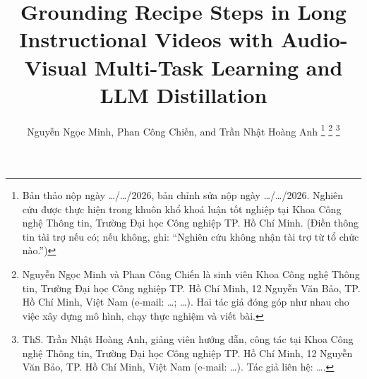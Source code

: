 \documentclass{IEEEtran}
\begin{document}
\title{Grounding Recipe Steps in Long Instructional Videos with Audio-Visual Multi-Task Learning and LLM Distillation}
\author{Nguyễn Ngọc Minh, Phan Công Chiến, and Trần Nhật Hoàng Anh
\thanks{Bản thảo nộp ngày \ldots/\ldots/2026, bản chỉnh sửa nộp ngày \ldots/\ldots/2026. Nghiên cứu được thực hiện trong khuôn khổ khoá luận tốt nghiệp tại Khoa Công nghệ Thông tin, Trường Đại học Công nghiệp TP. Hồ Chí Minh. (Điền thông tin tài trợ nếu có; nếu không, ghi: ``Nghiên cứu không nhận tài trợ từ tổ chức nào.'')}
\thanks{Nguyễn Ngọc Minh và Phan Công Chiến là sinh viên Khoa Công nghệ Thông tin, Trường Đại học Công nghiệp TP. Hồ Chí Minh, 12 Nguyễn Văn Bảo, TP. Hồ Chí Minh, Việt Nam (e-mail: \ldots; \ldots). Hai tác giả đóng góp như nhau cho việc xây dựng mô hình, chạy thực nghiệm và viết bài.}
\thanks{ThS. Trần Nhật Hoàng Anh, giảng viên hướng dẫn, công tác tại Khoa Công nghệ Thông tin, Trường Đại học Công nghiệp TP. Hồ Chí Minh, 12 Nguyễn Văn Bảo, TP. Hồ Chí Minh, Việt Nam (e-mail: \ldots). Tác giả liên hệ: \ldots.}}

\maketitle
\end{document}

